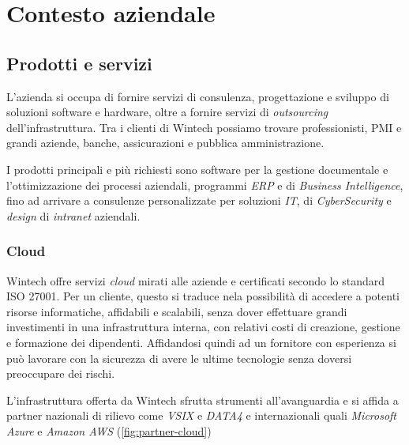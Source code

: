 \chapter{Contesto aziendale}
\label{cap:azienda}


\section{Prodotti e servizi}

L'azienda si occupa di fornire servizi di consulenza, progettazione e sviluppo di soluzioni software e hardware, oltre a fornire servizi di \emph{outsourcing} dell'infrastruttura. Tra i clienti di Wintech possiamo trovare professionisti, PMI e grandi aziende, banche, assicurazioni e pubblica amministrazione.

I prodotti principali e più richiesti sono software per la gestione documentale e l'ottimizzazione dei processi aziendali, programmi \emph{ERP} e di \emph{Business Intelligence}, fino ad arrivare a consulenze personalizzate per soluzioni \emph{IT}, di \emph{CyberSecurity} e \emph{design} di \emph{intranet} aziendali.

\subsection{Cloud}
\label{sez:azienda-cloud}
Wintech offre servizi \emph{cloud} mirati alle aziende e certificati secondo lo standard ISO 27001. Per un cliente, questo si traduce nela possibilità di accedere a potenti risorse informatiche, affidabili e scalabili, senza dover effettuare grandi investimenti in una infrastruttura interna, con relativi costi di creazione, gestione e formazione dei dipendenti. Affidandosi quindi ad un fornitore con esperienza si può lavorare con la sicurezza di avere le ultime tecnologie senza doversi preoccupare dei rischi.\cite{site:wtc-cloud}

L'infrastruttura offerta da Wintech sfrutta strumenti all'avanguardia e si affida a partner nazionali di rilievo come \emph{VSIX} e \emph{DATA4} e internazionali quali \emph{Microsoft Azure} e \emph{Amazon AWS} (\autoref{fig:partner-cloud})

